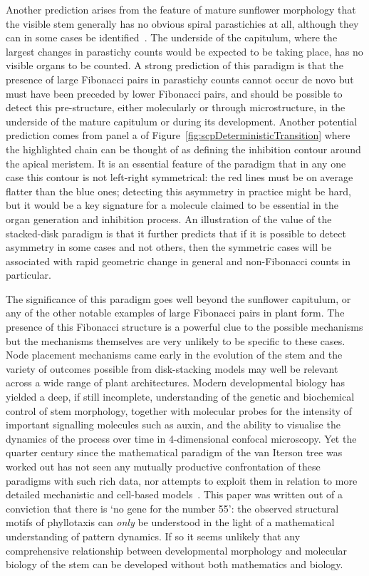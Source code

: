 \documentclass[a4paper,10pt]{amsart}
\begin{document}
Another prediction arises from the  feature of mature sunflower morphology that the visible stem generally has no obvious spiral parastichies at all, although they can in some cases be identified~\cite{couderInitialTransitionsOrder1998}. The underside of the capitulum, where the largest changes in parastichy counts would be expected to be taking place, has no visible organs to be counted. A strong prediction of this paradigm is that the presence of large Fibonacci pairs in parastichy counts cannot occur de novo but must have been preceded by lower Fibonacci pairs, and should be possible to detect this pre-structure, either molecularly or through microstructure, in the underside of the mature capitulum or during its development. Another
potential prediction comes from panel a of Figure~\ref{fig:scpDeterministicTransition} where the highlighted chain can be thought of as defining the inhibition contour around the apical meristem. It is an essential feature of the paradigm that in any one case this contour is not left-right symmetrical: the red lines must be on average flatter than the blue ones; detecting this asymmetry in practice might be  hard, but it would be  a key signature for a molecule claimed to be essential in the organ generation and inhibition process. An illustration of the value of the stacked-disk paradigm is that it further predicts that if it is possible to detect asymmetry in some cases and not others, then the symmetric cases will be associated with rapid geometric change in general and non-Fibonacci counts in particular. 

The significance of this paradigm goes well beyond the sunflower capitulum, or any of the other notable examples of large Fibonacci pairs in plant form.  The presence of this Fibonacci structure is a powerful clue to the possible mechanisms but the mechanisms themselves are very unlikely to be specific to these cases. Node placement mechanisms came early in the evolution of the stem and the variety of outcomes possible from disk-stacking models may well be relevant across a wide range of plant architectures. Modern developmental biology has yielded a  deep, if still incomplete, understanding of the genetic and biochemical control of stem morphology, together with molecular probes for the intensity of important signalling  molecules such as auxin, and the ability to visualise the dynamics of the process over time in 4-dimensional confocal microscopy.  Yet the quarter century since the mathematical paradigm of the van Iterson tree was worked out has not seen any mutually productive confrontation of these paradigms with such rich data, nor attempts to exploit them in relation to more detailed mechanistic and cell-based models~\cite{newellFibonacciPatternsCommon2013}. This paper was written out of a conviction that there is `no gene for the number 55': the observed structural motifs of phyllotaxis can \textit{only} be understood in the light of a mathematical understanding of pattern dynamics. If so it seems unlikely that any comprehensive relationship between developmental morphology and molecular biology of the stem can be developed without both mathematics and biology. 
\end{document}
